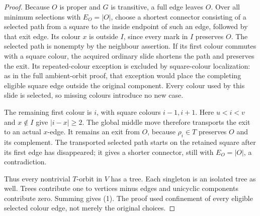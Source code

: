 \documentclass[11pt,a4paper]{article}
\begin{document}
\begin{proof}
Because $O$ is proper and $G$ is transitive, a full edge leaves $O$.
Over all minimum selections with $E_O=|O|$, choose a shortest
connector consisting of a selected path from a square to the inside
endpoint of such an edge, followed by that exit edge. Its colour
$x$ is outside $I$, since every mark in $I$ preserves $O$.
The selected path is nonempty by the neighbour assertion.
If its first colour commutes with a square colour, the acquired
ordinary slide shortens the path and preserves the exit. Its
repeated-colour exception is excluded by square-colour localization:
as in the full ambient-orbit proof, that exception would place the
completing eligible square edge outside the original component.
Every colour used by this slide is selected, so missing colours
introduce no new case.

The remaining first colour is $i$, with square colours $i-1,i+1$.
Here $u<i<v$ and $x\notin I$ give $|i-x|\ge2$.
The global middle move therefore transports the exit to an actual
$x$-edge. It remains an exit from $O$, because $\rho_i\in T$
preserves $O$ and its complement. The transported selected path
starts on the retained square after its first edge has disappeared;
it gives a shorter connector, still with $E_O=|O|$, a contradiction.

Thus every nontrivial $T$-orbit in $V$ has a tree. Each singleton
is an isolated tree as well. Trees contribute one to vertices
minus edges and unicyclic components contribute zero. Summing
gives (1). The proof used confinement of every eligible selected
colour edge, not merely the original choices.
\end{proof}
\end{document}
